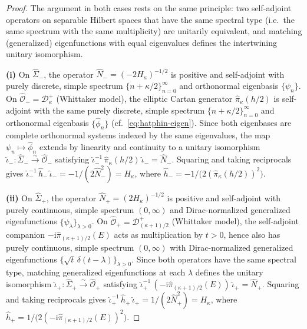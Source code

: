 \documentclass[11pt]{article}
\theoremstyle{plain}
\theoremstyle{definition}
\theoremstyle{remark}
\newcommand{\Sigmah}{\widehat{\Sigma}}
\newcommand{\OOh}{\widehat{\mathcal{O}}}
\newcommand{\D}{\mathcal{D}}
\newcommand{\ii}{\mathrm{i}}
\begin{document}
\begin{proof}
The argument in both cases rests on the same principle: two self-adjoint
operators on separable Hilbert spaces that have the same spectral type
(i.e.\ the same spectrum with the same multiplicity) are unitarily
equivalent, and matching (generalized) eigenfunctions with equal
eigenvalues defines the intertwining unitary isomorphism.

\smallskip\noindent\textbf{(i)}
On $\Sigmah_{-}$, the operator
$\hat N_{-}=(-2H_{\kappa})^{-1/2}$ is positive and self-adjoint with
purely discrete, simple spectrum
$\{n+\kappa/2\}_{n=0}^{\infty}$ and orthonormal eigenbasis
$\{\psi_{n}\}$.
On $\OOh_{-}=\D^{+}_{\kappa}$ (Whittaker model), the elliptic Cartan
generator $\hat\pi_{\kappa}(h/2)$ is self-adjoint with the same purely
discrete, simple spectrum $\{n+\kappa/2\}_{n=0}^{\infty}$ and
orthonormal eigenbasis $\{\hat\phi_{n}\}$
(cf.~\eqref{eq:hatphin-eigen}).
Since both eigenbases are complete orthonormal systems indexed by the
same eigenvalues, the map $\psi_{n}\mapsto\hat\phi_{n}$ extends by
linearity and continuity to a unitary isomorphism
$\hat\iota_{-}\colon\Sigmah_{-}\xrightarrow{\sim}\OOh_{-}$
satisfying $\hat\iota_{-}^{-1}\,\hat\pi_{\kappa}(h/2)\,\hat\iota_{-}
=\hat N_{-}$.
Squaring and taking reciprocals gives
$\hat\iota_{-}^{-1}\,\hat h_{-}\,\hat\iota_{-}
=-1/(2\hat N_{-}^{2})=H_{\kappa}$, where
$\hat h_{-}=-1/\bigl(2(\hat\pi_{\kappa}(h/2))^{2}\bigr)$.

\smallskip\noindent\textbf{(ii)}
On $\Sigmah_{+}$, the operator
$\hat N_{+}=(2H_{\kappa})^{-1/2}$ is positive and self-adjoint with
purely continuous, simple spectrum $(0,\infty)$ and Dirac-normalized
generalized eigenfunctions $\{\psi_{\lambda}\}_{\lambda>0}$.
On $\OOh_{+}=\D^{+}_{(\kappa+1)/2}$ (Whittaker model), the self-adjoint
companion $-\ii\hat\pi_{(\kappa+1)/2}(E)$ acts as
multiplication by $t>0$, hence also has purely continuous, simple
spectrum $(0,\infty)$ with Dirac-normalized generalized eigenfunctions
$\{\sqrt{t}\,\delta(t-\lambda)\}_{\lambda>0}$.
Since both operators have the same spectral type, matching generalized
eigenfunctions at each $\lambda$ defines the unitary isomorphism
$\hat\iota_{+}\colon\Sigmah_{+}\xrightarrow{\sim}\OOh_{+}$
satisfying $\hat\iota_{+}^{-1}\,(-\ii\hat\pi_{(\kappa+1)/2}(E))\,\hat\iota_{+}
=\hat N_{+}$.
Squaring and taking reciprocals gives
$\hat\iota_{+}^{-1}\,\hat h_{+}\,\hat\iota_{+}
=1/(2\hat N_{+}^{2})=H_{\kappa}$, where
$\hat h_{+}=1/\bigl(2(-\ii\hat\pi_{(\kappa+1)/2}(E))^{2}\bigr)$.
\end{proof}
\end{document}
